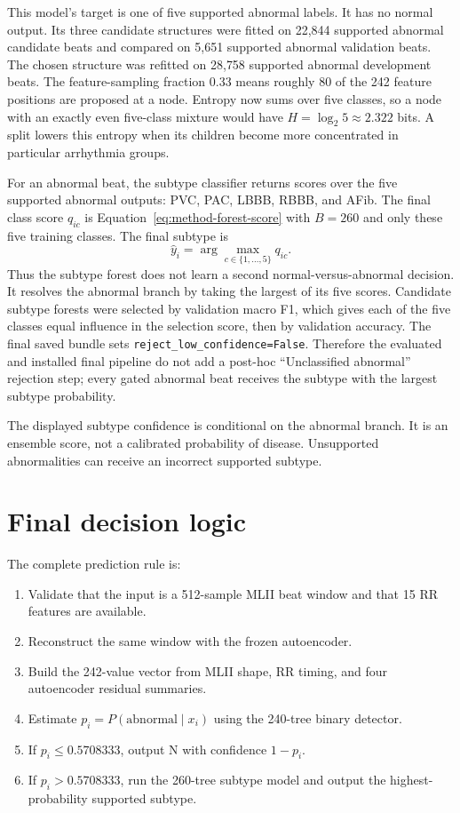 This model's target is one of five supported abnormal labels. It has no
normal output. Its three candidate structures were fitted on 22,844
supported abnormal candidate beats and compared on 5,651 supported abnormal
validation beats. The chosen structure was refitted on 28,758 supported
abnormal development beats. The feature-sampling fraction 0.33 means roughly
80 of the 242 feature positions are proposed at a node. Entropy now sums
over five classes, so a node with an exactly even five-class mixture would
have $H=\log_2 5\approx2.322$ bits. A split lowers this entropy when its
children become more concentrated in particular arrhythmia groups.

For an abnormal beat, the subtype classifier returns scores over the
five supported abnormal outputs: PVC, PAC, LBBB, RBBB, and AFib. The final
class score $q_{ic}$ is Equation~\ref{eq:method-forest-score} with $B=260$
and only these five training classes. The final subtype is
\begin{equation}
 \widehat y_i=\arg\max_{c\in\{1,\ldots,5\}}q_{ic}.
 \label{eq:final-decision}
\end{equation}
Thus the subtype forest does not learn a second normal-versus-abnormal
decision. It resolves the abnormal branch by taking the largest of its five
scores. Candidate subtype forests were selected by validation macro F1,
which gives each of the five classes equal influence in the selection score,
then by validation accuracy.
The final saved bundle sets \texttt{reject\_low\_confidence=False}. Therefore
the evaluated and installed final pipeline do not add a post-hoc
``Unclassified abnormal'' rejection step; every gated abnormal beat receives
the subtype with the largest subtype probability.

The displayed subtype confidence is conditional on the abnormal branch. It
is an ensemble score, not a calibrated probability of disease. Unsupported
abnormalities can receive an incorrect supported subtype.

\section{Final decision logic}

The complete prediction rule is:
\begin{enumerate}
\item Validate that the input is a 512-sample MLII beat window and that 15 RR
features are available.
\item Reconstruct the same window with the frozen autoencoder.
\item Build the 242-value vector from MLII shape, RR timing, and four
autoencoder residual summaries.
\item Estimate $p_i=P(\mathrm{abnormal}\mid x_i)$ using the 240-tree binary
detector.
\item If $p_i\leq0.5708333$, output N with confidence $1-p_i$.
\item If $p_i>0.5708333$, run the 260-tree subtype model and output the
highest-probability supported subtype.
\end{enumerate}

